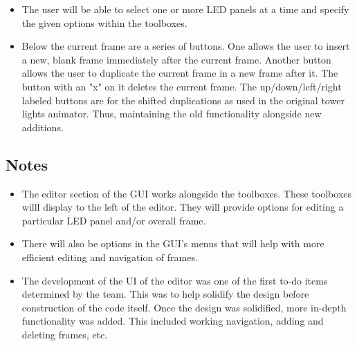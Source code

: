\documentclass{article}
\begin{document}
\begin{itemize}
\begin{itemize}
			\item The user will be able to select one or more LED panels at a time and specify the given options within the toolboxes.
			\item Below the current frame are a series of buttons. One allows the user to insert a new, blank frame immediately after the current frame. Another button allows the user to duplicate the current frame in a new frame after it.  The button with an "x" on it deletes the current frame.  The up/down/left/right labeled buttons are for the shifted duplications as used in the original tower lights animator.  Thus, maintaining the old functionality alongside new additions. 
		\end{itemize}
	\end{itemize}
	
	\subsection{Notes}
	\begin{itemize}
		\item The editor section of the GUI  works alongside the toolboxes. These toolboxes willl display to the left of the editor. They will provide options for editing a particular LED panel and/or overall frame. %
		\item There will also be options in the GUI's menus that will help with more efficient editing and navigation of frames.
		\item The development of the UI of the editor was one of the first to-do items determined by the team.  This was to help solidify the design before construction of the code itself. Once the design was solidified, more in-depth functionality was added.  This included working navigation, adding and deleting frames, etc.
	\end{itemize}
	
	
\end{document}
